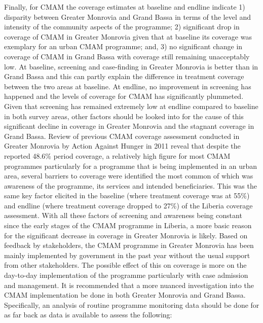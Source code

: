 \documentclass[12pt,a4paper]{article}
\begin{document}
Finally, for CMAM the coverage estimates at baseline and endline indicate 1) disparity between Greater Monrovia and Grand Bassa in terms of the level and intensity of the community aspects of the programme; 2) significant drop in coverage of CMAM in Greater Monrovia given that at baseline its coverage was exemplary for an urban CMAM programme; and, 3) no significant change in coverage of CMAM in Grand Bassa with coverage still remaining unacceptably low. At baseline, screening and case-finding in Greater Monrovia is better than in Grand Bassa and this can partly explain the difference in treatment coverage between the two areas at baseline. At endline, no improvement in screening has happened and the levels of coverage for CMAM has significantly plummeted. Given that screening has remained extremely low at endline compared to baseline in both survey areas, other factors should be looked into for the cause of this significant decline in coverage in Greater Monrovia and the stagnant coverage in Grand Bassa. Review of previous CMAM coverage assessment conducted in Greater Monrovia by Action Against Hunger in 2011 \citep{AccionContralaFaim:2011vu} reveal that despite the reported 48.6\% period coverage, a relatively high figure for most CMAM programmes particularly for a programme that is being implemented in an urban area, several barriers to coverage were identified the most common of which was awareness of the programme, its services and intended beneficiaries. This was the same key factor elicited in the baseline (where treatment coverage was at 55\%) and endline (where treatment coverage dropped to 27\%) of the Liberia coverage assessment. With all these factors of screening and awareness being constant since the early stages of the CMAM programme in Liberia, a more basic reason for the significant decrease in coverage in Greater Monrovia is likely. Based on feedback by stakeholders, the CMAM programme in Greater Monrovia has been mainly implemented by government in the past year without the usual support from other stakeholders. The possible effect of this on coverage is more on the day-to-day implementation of the programme particularly with case admission and management. It is recommended that a more nuanced investigation into the CMAM implementation be done in both Greater Monrovia and Grand Bassa. Specifically, an analysis of routine programme monitoring data should be done for as far back as data is available to assess the following:
\end{document}
